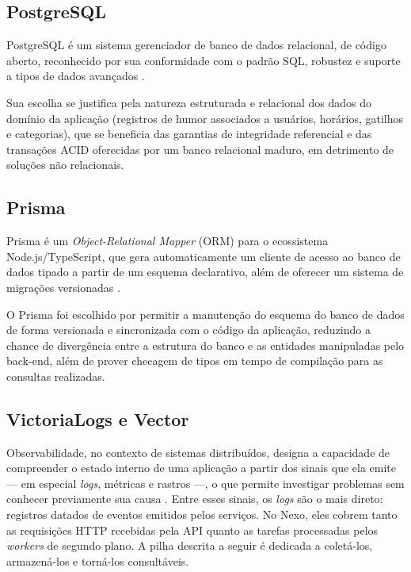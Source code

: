 \subsection{PostgreSQL}

PostgreSQL é um sistema gerenciador de banco de dados relacional, de código
aberto, reconhecido por sua conformidade com o padrão SQL, robustez e suporte
a tipos de dados avançados \citep{postgresql:2026}.

Sua escolha se justifica pela natureza estruturada e relacional dos dados do
domínio da aplicação (registros de humor associados a usuários, horários,
gatilhos e categorias), que se beneficia das garantias de integridade
referencial e das transações ACID oferecidas por um banco relacional
maduro, em detrimento de soluções não relacionais.

\subsection{Prisma}

Prisma é um \textit{Object-Relational Mapper} (ORM) para o ecossistema
Node.js/TypeScript, que gera automaticamente um cliente de acesso ao banco de
dados tipado a partir de um esquema declarativo, além de oferecer um sistema
de migrações versionadas \citep{prisma:2026}.

O Prisma foi escolhido por permitir a manutenção do esquema do banco de dados
de forma versionada e sincronizada com o código da aplicação, reduzindo a
chance de divergência entre a estrutura do banco e as entidades manipuladas
pelo back-end, além de prover checagem de tipos em tempo de compilação para
as consultas realizadas.

\subsection{VictoriaLogs e Vector}

Observabilidade, no contexto de sistemas distribuídos, designa a capacidade de
compreender o estado interno de uma aplicação a partir dos sinais que ela emite
--- em especial \textit{logs}, métricas e rastros ---, o que permite investigar
problemas sem conhecer previamente sua causa \citep{opentelemetry:2026}. Entre
esses sinais, os \textit{logs} são o mais direto: registros datados de eventos
emitidos pelos serviços. No Nexo, eles cobrem tanto as requisições HTTP
recebidas pela API quanto as tarefas processadas pelos \textit{workers} de
segundo plano. A pilha descrita a seguir é dedicada a coletá-los, armazená-los
e torná-los consultáveis.

